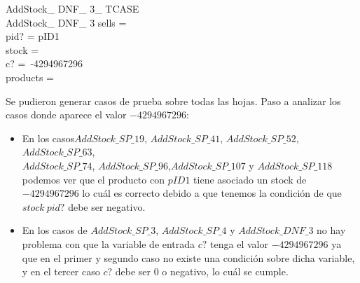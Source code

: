 \documentclass[fleqn,colorlinks,linkcolor=blue,citecolor=blue,urlcolor=blue]{article}
\newcommand{\negate}[0]{-}
\begin{document}
\begin{multicols}{2}
\begin{schema}{AddStock\_ DNF\_ 3\_ TCASE}\\
 AddStock\_ DNF\_ 3
\where
 sells =~\emptyset \\
 pid? = pID1 \\
 stock =~\emptyset \\
 c? =~\negate 4294967296 \\
 products =~\emptyset
\end{schema}
\end{multicols}

Se pudieron generar casos de prueba sobre todas las hojas. Paso a analizar los casos donde aparece el valor $-4294967296$:

\begin{itemize}
    \item En los casos$AddStock\_SP\_19$, $AddStock\_SP\_41$, $AddStock\_SP\_52$, $AddStock\_SP\_63$, \\ $AddStock\_SP\_74$, $AddStock\_SP\_96$,$AddStock\_SP\_107$ y $AddStock\_SP\_118$ podemos ver que el producto con $pID1$ tiene asociado un stock de $-4294967296$ lo cuál es correcto debido a que tenemos la condición de que $stock~pid?$ debe ser negativo.
    \item En los casos de $AddStock\_SP\_3$,  $AddStock\_SP\_4$ y $AddStock\_DNF\_3$ no hay problema con que la variable de entrada $c?$ tenga el valor $-4294967296$ ya que en el primer y segundo caso no existe una condición sobre dicha variable, y en el tercer caso $c?$ debe ser 0 o negativo, lo cuál se cumple.
\end{itemize}
\end{document}
